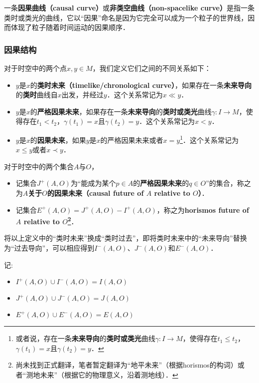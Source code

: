 一条\textbf{因果曲线（causal curve）}或\textbf{非类空曲线（non-spacelike curve）}是指一条类时或类光的曲线，它以“因果”命名是因为它完全可以成为一个粒子的世界线，因而体现了粒子随着时间运动的因果顺序．


\subsubsection{因果结构}

对于时空中的两个点$x, y\in M$，我们定义它们之间的不同关系如下：

\begin{itemize}
\item $y$是$x$的\textbf{类时未来（timelike/chronological curve）}，如果存在一条\textbf{未来导向}的\textbf{类时}曲线自$x$出发，并经过$y$．这个关系常记为$x\ll y$．
\item $y$是$x$的\textbf{严格因果未来}，如果存在一条\textbf{未来导向}的\textbf{类时或类光}曲线$\gamma:I\rightarrow M$，使得存在$t_1<t_2$，$\gamma(t_1)=x$且$\gamma(t_2)=y$．这个关系常记为$x< y$．
\item $y$是$x$的\textbf{因果未来}，如果$y$是$x$的严格因果未来或者$x=y$\footnote{或者说，存在一条\textbf{未来导向}的\textbf{类时或类光}曲线$\gamma:I\rightarrow M$，使得存在$t_1\leq t_2$，$\gamma(t_1)=x$且$\gamma(t_2)=y$．}．这个关系常记为$x\leq y$或者$x\prec y$．
\end{itemize}

对于时空中的两个集合$A$与$O$，


\begin{itemize}
$I^+(A, O)$为“能成为某个$p\in A$的\textbf{类时未来}的$q\in O$”的集合，称之为\textbf{$A$关于$O$的类时未来（choronological future of $A$ relative to $O$）}．
\item 记集合$J^+(A, O)$为“能成为某个$p\in A$的\textbf{严格因果未来}的$q\in O$”的集合，称之为\textbf{$A$关于$O$的因果未来（causal future of $A$ relative to $O$）}．
\item 记集合$E^+(A, O)=J^+(A, O)-I^+(A, O)$，称之为\textbf{horismos future of $A$ relative to $O$\footnote{尚未找到正式翻译，笔者暂定翻译为“地平未来”（根据horismos的构词）或者“测地未来”（根据它的物理意义，沿着测地线）．}}．
\end{itemize}

将以上定义中的“类时未来”换成“类时过去”，即将类时未来中的“未来导向”替换为“过去导向”，可以相应得到$I^-(A, O)$、$J^-(A, O)$和$E^-(A, O)$．

记:
\begin{itemize}
\item $I^+(A, O)\cup I^-(A, O)=I(A,O)$
\item $J^+(A, O)\cup J^-(A, O)=J(A,O)$
\item $E^+(A, O)\cup E^-(A, O)=E(A,O)$
\end{itemize}

